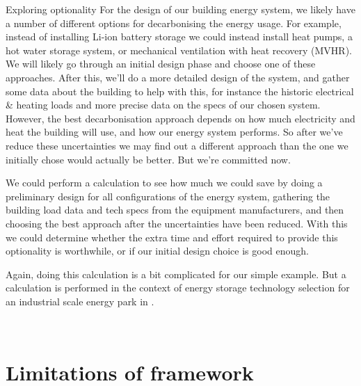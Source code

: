 \begin{ebox}{Exploring optionality}
    For the design of our building energy system, we likely have a number of different options for decarbonising the energy usage. For example, instead of installing Li-ion battery storage we could instead install heat pumps, a hot water storage system, or mechanical ventilation with heat recovery (MVHR). We will likely go through an initial design phase and choose one of these approaches. After this, we'll do a more detailed design of the system, and gather some data about the building to help with this, for instance the historic electrical \& heating loads and more precise data on the specs of our chosen system. However, the best decarbonisation approach depends on how much electricity and heat the building will use, and how our energy system performs. So after we've reduce these uncertainties we may find out a different approach than the one we initially chose would actually be better. But we're committed now.

    We could perform a  calculation to see how much we could save by doing a preliminary design for all configurations of the energy system, gathering the building load data and tech specs from the equipment manufacturers, and then choosing the best approach after the uncertainties have been reduced. With this we could determine whether the extra time and effort required to provide this optionality is worthwhile, or if our initial design choice is good enough.

    Again, doing this calculation is a bit complicated for our simple example. But a  calculation is performed in the context of energy storage technology selection for an industrial scale energy park in .
\end{ebox}\


\section{Limitations of framework} \label{sec:methodology-limitations}

